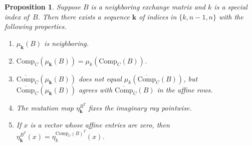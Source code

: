 \documentclass[10pt]{article}
\newtheorem{proposition}{Proposition}[section]
\theoremstyle{definition}
\theoremstyle{remark}
\numberwithin{equation}{section}
\newcommand{\set}[1]{{\lbrace #1 \rbrace}}
\newcommand{\0}{{\mathbf{0}}}
\newcommand{\Comp}{\mathrm{Comp}_C}
\newcommand{\CompPlus}{\overline{\mathrm{Comp}}_C}
\newcommand{\kk}{{\boldsymbol{k}}}
\begin{document}
\begin{proposition}\label{special mut}
Suppose $B$ is a neighboring exchange matrix and $k$ is a special index of~$B$.
Then there exists a sequence $\kk$ of indices in $\set{k,n-1,n}$ with the following properties.
\begin{enumerate}[label=\bf\arabic*., ref=\arabic*]
\item
$\mu_\kk(B)$ is neighboring.
\item
$\Comp(\mu_\kk(B))=\mu_k(\Comp(B))$.
\item
$\CompPlus(\mu_\kk(B))$ does not equal $\mu_k(\CompPlus(B))$, but $\CompPlus(\mu_\kk(B))$ agrees with $\CompPlus(B)$ in the affine rows.
\item
The mutation map $\eta^{B^T}_\kk$ fixes the imaginary ray pointwise.
\item
If $x$ is a vector whose affine entries are zero, then $\eta^{B^T}_\kk(x)=\eta^{\Comp(B)^T}_k(x)$.
\end{enumerate}
\end{proposition}
\end{document}
